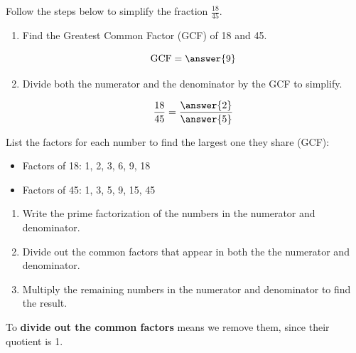 \documentclass{ximera}[font=12pt]  %
\begin{document}
\begin{problem}
  Follow the steps below to simplify the fraction $\displaystyle \frac{18}{45}.$

  \begin{enumerate}
  \item Find the Greatest Common Factor (GCF) of 18 and 45.

  \[ \textrm{GCF} = \answer{9}  \]

  
  \item Divide both the numerator and the denominator by the GCF to simplify.

  \[ \frac{18}{45} = \frac{\answer{2}}{\answer{5}} \]

  \end{enumerate}

  \begin{hint}
    List the factors for each number to find the largest one they share (GCF):
    \begin{itemize}
        \item Factors of 18: 1, 2, 3, 6, 9, 18
        \item Factors of 45: 1, 3, 5, 9, 15, 45
    \end{itemize}
  \end{hint}
\end{problem}

\begin{procedure}

\begin{enumerate}
  \item Write the prime factorization of the numbers in the numerator and denominator.  

  \item Divide out the common factors that appear in both the the numerator and denominator.

  \item Multiply the remaining numbers in the numerator and denominator to find the result.

\end{enumerate}

\begin{remark}
To \textbf{divide out the common factors} means we remove them, since their quotient is 1.
\end{remark}

\end{procedure}
\end{document}

